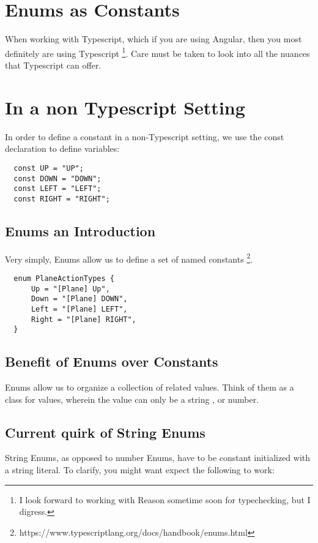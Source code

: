 \maketitle{}
\section{ Enums as Constants }

When working with Typescript, which if you are using Angular, then you most
definitely are using Typescript \footnote{I look forward to working with
Reason sometime soon for typechecking, but I digress.}. Care must be taken to
look into all the nuances that Typescript can offer.

\section{ In a non Typescript Setting }

In order to define a constant in a non-Typescript setting, we use the const
declaration to define variables:

\begin{lstlisting}
  const UP = "UP";
  const DOWN = "DOWN";
  const LEFT = "LEFT";
  const RIGHT = "RIGHT";
\end{lstlisting}

\subsection{ Enums an Introduction }
Very simply, Enums allow us to define a set of named constants
\footnote{https://www.typescriptlang.org/docs/handbook/enums.html}.

\begin{lstlisting}
  enum PlaneActionTypes {
      Up = "[Plane] Up",
      Down = "[Plane] DOWN",
      Left = "[Plane] LEFT",
      Right = "[Plane] RIGHT",
  }
\end{lstlisting}

\subsection{ Benefit of Enums over Constants }
Enums allow us to organize a collection of related values. Think of them as
a class for values, wherein the value can only be a string , or number.

\subsection{ Current quirk of String Enums }
String Enums, as opposed to number Enums, have to be constant initialized
with a string literal. To clarify, you might want expect the following to work:

